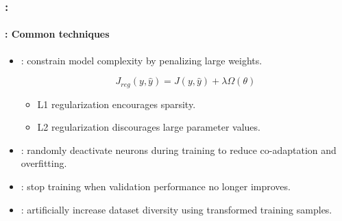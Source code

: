 \documentclass[xcolor=table]{beamer}
\begin{document}
\begin{frame}
	\frametitle{\insertshortsubtitle: \insertsection}
	\framesubtitle{\insertsubsection: Common techniques}
	
	\begin{itemize}
		
		\item {}: constrain model complexity by penalizing large weights.
		
		\[
		J_{reg}(y, \hat{y})
		=
		J(y, \hat{y})
		+
		\lambda \Omega(\theta)
		\]
		
		\begin{itemize}
			\item L1 regularization encourages sparsity.
			\item L2 regularization discourages large parameter values.
		\end{itemize}
		
		\vspace{0.2cm}
		
		\item {}: randomly deactivate neurons during training to reduce co-adaptation and overfitting.
		
		\vspace{0.2cm}
		
		\item {}: stop training when validation performance no longer improves.
		
		\vspace{0.2cm}
		
		\item {}: artificially increase dataset diversity using transformed training samples.
		
	\end{itemize}
	
\end{frame}
\end{document}
